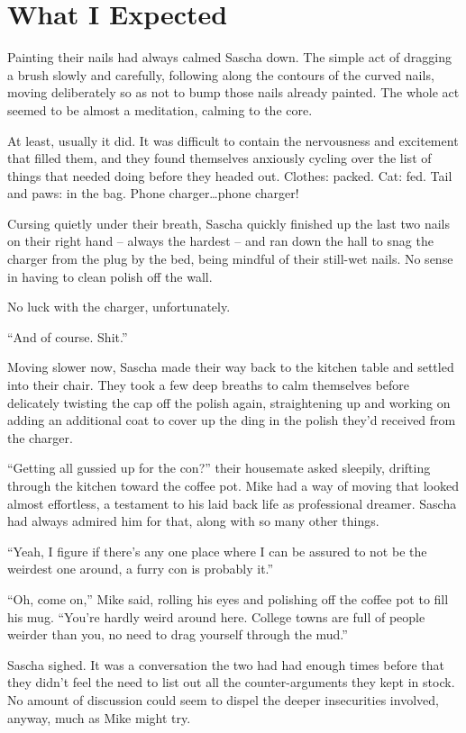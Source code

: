 \documentclass[12pt,letterpaper,oneside]{memoir}
\begin{document}
  \chapter{What I Expected}

  Painting their nails had always calmed Sascha down. The simple act of dragging a brush slowly and carefully, following along the contours of the curved nails, moving deliberately so as not to bump those nails already painted. The whole act seemed to be almost a meditation, calming to the core.

  At least, usually it did. It was difficult to contain the nervousness and excitement that filled them, and they found themselves anxiously cycling over the list of things that needed doing before they headed out. Clothes: packed. Cat: fed. Tail and paws: in the bag. Phone charger\ldots{}phone charger!

  Cursing quietly under their breath, Sascha quickly finished up the last two nails on their right hand -- always the hardest -- and ran down the hall to snag the charger from the plug by the bed, being mindful of their still-wet nails. No sense in having to clean polish off the wall.

  No luck with the charger, unfortunately.

  ``And of course. Shit.''

  Moving slower now, Sascha made their way back to the kitchen table and settled into their chair. They took a few deep breaths to calm themselves before delicately twisting the cap off the polish again, straightening up and working on adding an additional coat to cover up the ding in the polish they'd received from the charger.

  ``Getting all gussied up for the con?'' their housemate asked sleepily, drifting through the kitchen toward the coffee pot. Mike had a way of moving that looked almost effortless, a testament to his laid back life as professional dreamer. Sascha had always admired him for that, along with so many other things.

  ``Yeah, I figure if there's any one place where I can be assured to not be the weirdest one around, a furry con is probably it.''

  ``Oh, come on,'' Mike said, rolling his eyes and polishing off the coffee pot to fill his mug. ``You're hardly weird around here. College towns are full of people weirder than you, no need to drag yourself through the mud.''

  Sascha sighed. It was a conversation the two had had enough times before that they didn't feel the need to list out all the counter-arguments they kept in stock. No amount of discussion could seem to dispel the deeper insecurities involved, anyway, much as Mike might try.
\end{document}
